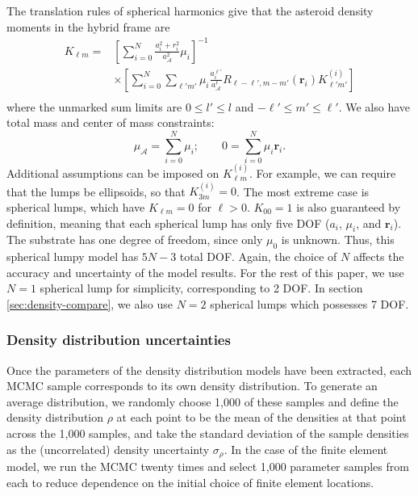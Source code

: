 \documentclass[fleqn,usenatbib]{mnras}
\newcommand{\brackets}[1]{\left[ #1 \right]}
\begin{document}
The translation rules of spherical harmonics \citep{Gelderen1998TheSO} give that the asteroid density moments in the hybrid frame are
\begin{equation}
  \begin{aligned}
    K_{\ell m} = &\brackets{\sum_{i=0}^N \frac{a_i^2 + r_i^2}
    {a_\mathcal{A}^2}\mu_i}^{-1} \\
    &\times \brackets{\sum_{i=0}^N \sum_{\ell' m'}\mu_i
    \frac{a_i^{\ell'}}{a_\mathcal{A}^\ell}
    R_{\ell - \ell', m - m'}(\bm r_i)K_{\ell' m'}^{(i)}} \\
  \end{aligned}
\end{equation}
where the unmarked sum limits are $0 \leq l' \leq l$ and $-\ell' \leq m' \leq \ell'$. We also have total mass and center of mass constraints:
\begin{equation}
  \mu_\mathcal{A} = \sum_{i=0}^N \mu_i;  \qquad 0 = \sum_{i=0}^N \mu_i \bm r_i.
\end{equation}
Additional assumptions can be imposed on $K_{\ell m}^{(i)}$. For example, we can require that the lumps be ellipsoids, so that $K_{3 m}^{(i)} = 0$. The most extreme case is spherical lumps, which have $K_{\ell m} = 0$ for $\ell > 0$. $K_{00}=1$ is also guaranteed by definition, meaning that each spherical lump has only five DOF ($a_i$, $\mu_i$, and $\bm r_i$). The substrate has one degree of freedom, since only $\mu_0$ is unknown. Thus, this spherical lumpy model has $5N - 3$ total DOF. Again, the choice of $N$ affects the accuracy and uncertainty of the model results. For the rest of this paper, we use $N=1$ spherical lump for simplicity, corresponding to 2 DOF. In section \ref{sec:density-compare}, we also use $N=2$ spherical lumps which possesses 7 DOF.


\subsubsection{Density distribution uncertainties}
\label{sec:density-uncertainty-model}

Once the parameters of the density distribution models have been extracted, each MCMC sample corresponds to its own density distribution. To generate an average distribution, we randomly choose 1,000 of these samples and define the density distribution $\rho$ at each point to be the mean of the densities at that point across the 1,000 samples, and take the standard deviation of the sample densities as the (uncorrelated) density uncertainty $\sigma_\rho$. In the case of the finite element model, we run the MCMC twenty times and select 1,000 parameter samples from each to reduce dependence on the initial choice of finite element locations. 
\end{document}
